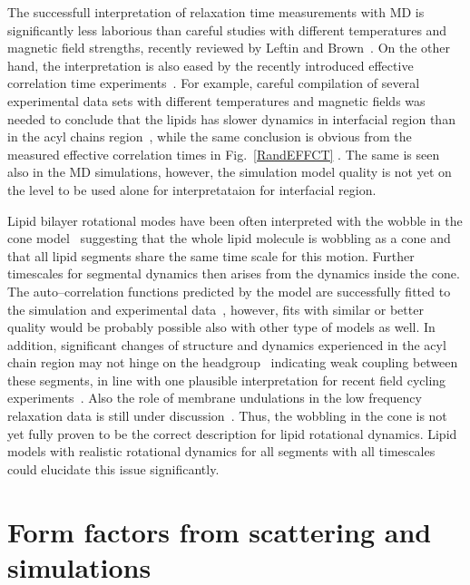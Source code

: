 \documentclass[aps,prl,superscriptaddress,twocolumn]{revtex4}
\begin{document}
The successfull interpretation of relaxation time measurements with MD is significantly less laborious
than careful studies with different temperatures and magnetic field strengths, recently reviewed by 
Leftin and Brown~\cite{leftin11}. On the other hand, the interpretation is also eased by  
the recently introduced effective correlation time experiments~\cite{ferreira15}.
For example, careful compilation of several experimental data sets with different
temperatures and magnetic fields was needed to conclude that the lipids has slower dynamics in
interfacial region than in the acyl chains region~\cite{leftin11}, while the same conclusion
is obvious from the measured effective correlation times in Fig.~\ref{RandEFFCT} \cite{ferreira15}.
The same is seen also in the MD simulations, however, the simulation model quality is not
yet on the level to be used alone for interpretataion for interfacial region.

Lipid bilayer rotational modes have been often interpreted with the 
wobble in the cone model~\cite{pastor88,pastor02,klauda08a,klauda08c,sivanandam09} suggesting
that the whole lipid molecule is wobbling as a cone and that all lipid segments share the same time scale for 
this motion. Further timescales for segmental dynamics then arises from the dynamics inside the cone. 
The auto--correlation functions predicted by the model are successfully fitted to the simulation and 
experimental data~\cite{pastor88,pastor02,klauda08a,klauda08c,sivanandam09}, however,
fits with similar or better quality would be probably possible also with other type of models as well.
In addition, significant changes of structure and dynamics experienced in the acyl chain region may not 
hinge on the headgroup~\cite{ferreiraTHESIS,botan15} indicating weak coupling 
between these segments, in line with one plausible interpretation for recent field cycling 
experiments~\cite{roberts09}. Also the role of membrane undulations in the low frequency 
relaxation data is still under discussion~\cite{leftin11,edholm08,klauda08a,klauda08c}.
Thus, the wobbling in the cone is not yet fully proven to be the correct description for lipid
rotational dynamics. Lipid models with realistic rotational dynamics for all segments 
with all timescales could elucidate this issue significantly.







\section{Form factors from scattering and simulations}
\end{document}
